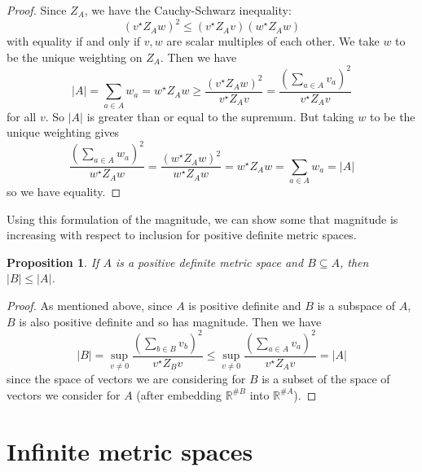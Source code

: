 \documentclass[11pt]{article}
\theoremstyle{mythm}
\newtheorem{prop}[defn]{Proposition}
\begin{document}
\begin{proof}
Since $Z_A$, we have the Cauchy-Schwarz inequality:
\begin{equation*}
(v^\star Z_A w)^2 \leq (v^\star Z_Av)(w^\star Z_Aw)
\end{equation*}
with equality if and only if $v,w$ are scalar multiples of each other. We take $w$ to be the unique weighting on $Z_A$. Then we have
\begin{equation*}
\vert A \vert = \sum\limits_{a\in A}w_a = w^\star Z_Aw \geq \frac{(v^\star Z_Aw)^2}{v^\star Z_Av} = \frac{\left(\sum_{a\in A}v_a\right)^2}{v^\star Z_Av}
\end{equation*}
for all $v$. So $\vert A \vert$ is greater than or equal to the supremum. But taking $w$ to be the unique weighting gives
\begin{equation*}
\frac{\left(\sum_{a\in A}w_a\right)^2}{w^\star Z_Aw} = \frac{(w^\star Z_Aw)^2}{w^\star Z_Aw} = w^\star Z_Aw = \sum\limits_{a\in A}w_a = \vert A \vert
\end{equation*}
so we have equality.
\end{proof}

Using this formulation of the magnitude, we can show some that magnitude is increasing with respect to inclusion for positive definite metric spaces.

\begin{prop}\label{prop:finiteposdefincreasing}
If $A$ is a positive definite metric space and $B \subseteq A$, then $\vert B \vert \leq \vert A \vert$.
\end{prop}

\begin{proof}
As mentioned above, since $A$ is positive definite and $B$ is a subspace of $A$, $B$ is also positive definite and so has magnitude. Then we have
\begin{equation*}
\vert B \vert = \sup\limits_{v\neq0}\frac{(\sum_{b\in B} v_b)^2}{v^\star Z_Bv} \leq \sup\limits_{v\neq0}\frac{(\sum_{a\in A}v_a)^2}{v^\star Z_Av} = \vert A\vert
\end{equation*}
since the space of vectors we are considering for $B$ is a subset of the space of vectors we consider for $A$ (after embedding $\mathbb{R}^{\#B}$ into $\mathbb{R}^{\#A}$).
\end{proof}

\section{Infinite metric spaces}
\end{document}
